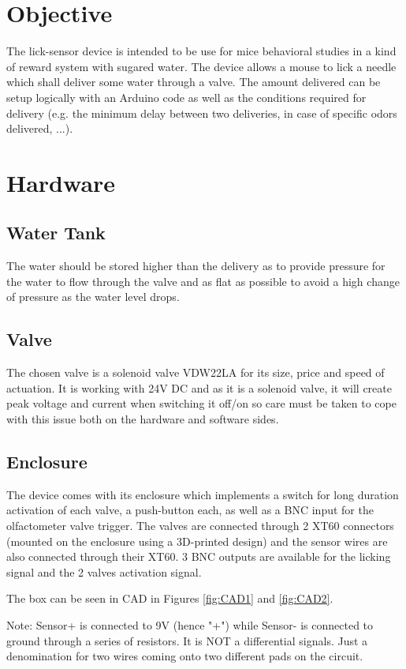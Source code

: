 \documentclass[a4paper]{article}
\begin{document}
\section{Objective}
The lick-sensor device is intended to be use for mice behavioral studies in a kind of reward system with sugared water. The device allows a mouse to lick a needle which shall deliver some water through a valve. The amount delivered can be setup logically with an Arduino code as well as the conditions required for delivery (e.g. the minimum delay between two deliveries, in case of specific odors delivered, ...). 

\section{Hardware}
\subsection{Water Tank}
The water should be stored higher than the delivery as to provide pressure for the water to flow through the valve and as flat as possible to avoid a high change of pressure as the water level drops.
\subsection{Valve}
The chosen valve is a solenoid valve VDW22LA for its size, price and speed of actuation. It is working with 24V DC and as it is a solenoid valve, it will create peak voltage and current when switching it off/on so care must be taken to cope with this issue both on the hardware and software sides.
\subsection{Enclosure}
The device comes with its enclosure which implements a switch for long duration activation of each valve, a push-button each, as well as a BNC input for the olfactometer valve trigger. The valves are connected through 2 XT60 connectors (mounted on the enclosure using a 3D-printed design) and the sensor wires are also connected through their XT60. 3 BNC outputs are available for the licking signal and the 2 valves activation signal.

The box can be seen in CAD in Figures \ref{fig:CAD1} and \ref{fig:CAD2}.

Note: Sensor+ is connected to 9V (hence "+") while Sensor- is connected to ground through a series of resistors. It is NOT a differential signals. Just a denomination for two wires coming onto two different pads on the circuit.
\end{document}
